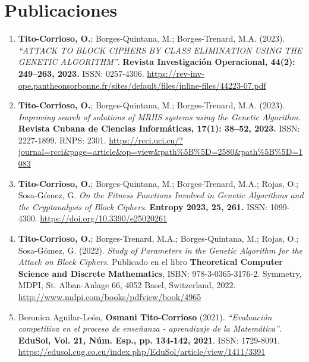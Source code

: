 
\section{{Publicaciones}}


\begin{enumerate}
	\item\textbf{Tito-Corrioso, O.}; Borges-Quintana, M.; Borges-Trenard, M.A. (2023). \textit{``\footnotesize{ATTACK TO BLOCK CIPHERS BY CLASS ELIMINATION USING THE GENETIC ALGORITHM}''}. \textbf{Revista Investigaci\'on Operacional, 44(2): 249--263, 2023.} ISSN: 0257-4306. \url{https://rev-inv-ope.pantheonsorbonne.fr/sites/default/files/inline-files/44223-07.pdf}
	\item \textbf{Tito-Corrioso, O.}; Borges-Quintana, M.; Borges-Trenard, M.A. (2023). \textit{Improving search of solutions of MRHS systems using the Genetic Algorithm}. \textbf{Revista Cubana de Ciencias Inform\'aticas, 17(1): 38--52, 2023.} ISSN: 2227-1899. RNPS: 2301. \url{https://rcci.uci.cu/?journal=rcci\&page=article\&op=view\&path\%5B\%5D=2580\&path\%5B\%5D=1083}
	\item \textbf{Tito-Corrioso, O.}; Borges-Quintana, M.; Borges-Trenard, M.A.; Rojas, O.; Sosa-G\'omez, G. \textit{On the Fitness Functions Involved in Genetic Algorithms and the Cryptanalysis of Block Ciphers}. \textbf{Entropy 2023, 25, 261.} ISSN: 1099-4300. \url{https://doi.org/10.3390/e25020261}%
   \item \textbf{Tito-Corrioso, O.}; Borges-Trenard, M.A.; Borges-Quintana, M.; Rojas, O.; Sosa-G\'omez, G. (2022). \textit{Study of Parameters in the Genetic Algorithm for the Attack on Block Ciphers}. Publicado en el libro \textbf{Theoretical Computer Science and
Discrete Mathematics}, ISBN: 978-3-0365-3176-2. Symmetry, MDPI, St. Alban-Anlage 66, 4052 Basel, Switzerland, 2022. \url{http://www.mdpi.com/books/pdfview/book/4965}
   \item Beronica Aguilar-Le\'on, \textbf{Osmani Tito-Corrioso} (2021). \textit{``Evaluaci\'on competitiva en el proceso de ense\~nanza - aprendizaje de la Matem\'atica''}. \textbf{EduSol, Vol. 21, N\'um. Esp., pp. 134-142, 2021}. ISSN: 1729-8091. \url{https://edusol.cug.co.cu/index.php/EduSol/article/view/1411/3391}

\end{enumerate}

